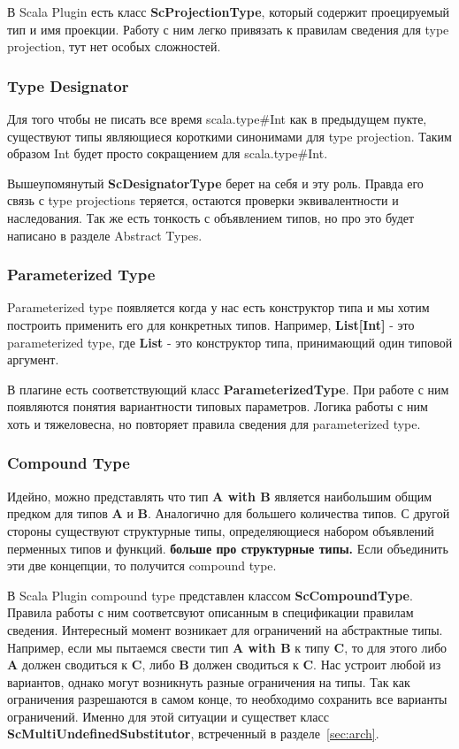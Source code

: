 В Scala Plugin есть класс \textbf{ScProjectionType}, который содержит
проецируемый тип и имя проекции.
Работу с ним легко привязать к правилам сведения для type projection,
тут нет особых сложностей.

\subsubsection{Type Designator}
Для того чтобы не писать все время scala.type\#Int как в предыдущем пукте,
существуют типы являющиеся короткими синонимами для type projection.
Таким образом Int будет просто сокращением для scala.type\#Int.

Вышеупомянутый \textbf{ScDesignatorType} берет на себя и эту роль.
Правда его связь с type projections теряется, остаются проверки эквивалентности
и наследования.
Так же есть тонкость с объявлением типов, но про это будет написано в разделе
Abstract Types.

\subsubsection{Parameterized Type}
Parameterized type появляется когда у нас есть конструктор типа и мы хотим
построить применить его для конкретных типов.
Например, \textbf{List[Int]} - это parameterized type,
где \textbf{List} - это конструктор типа, принимающий один типовой
аргумент.

В плагине есть соответствующий класс \textbf{ParameterizedType}.
При работе с ним появляются понятия вариантности типовых параметров.
Логика работы с ним хоть и тяжеловесна, но повторяет правила сведения для
parameterized type.

\subsubsection{Compound Type}
Идейно, можно представлять что тип \textbf{A with B} является наибольшим
общим предком для типов \textbf{A} и \textbf{B}.
Аналогично для большего количества типов.
С другой стороны существуют структурные типы, определяющиеся набором объявлений
перменных типов и функций.
\textbf{больше про структурные типы.}
Если объединить эти две концепции, то получится compound type.

В Scala Plugin compound type представлен классом \textbf{ScCompoundType}.
Правила работы с ним соответсвуют описанным в спецификации правилам сведения.
Интересный момент возникает для ограничений на абстрактные типы.
Например, если мы пытаемся свести тип \textbf{A with B} к типу \textbf{C},
то для этого либо \textbf{A} должен сводиться к \textbf{C}, либо \textbf{B}
должен сводиться к \textbf{C}.
Нас устроит любой из вариантов, однако могут возникнуть разные ограничения на
типы.
Так как ограничения разрешаются в самом конце, то необходимо сохранить все
варианты ограничений.
Именно для этой ситуации и существет класс \textbf{ScMultiUndefinedSubstitutor},
встреченный в разделе~\ref{sec:arch}.

